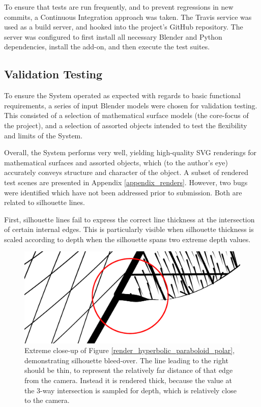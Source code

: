 To ensure that tests are run frequently, and to prevent regressions in new commits, a Continuous Integration approach was taken.
The Travis service was used as a build server, and hooked into the project's GitHub repository.
The server was configured to first install all necessary Blender and Python dependencies, install the add-on, and then execute the test suites.



\subsection{Validation Testing}

To ensure the System operated as expected with regards to basic functional requirements, a series of input Blender models were chosen for validation testing.
This consisted of a selection of mathematical surface models (the core-focus of the project), and a selection of assorted objects intended to test the flexibility and limits of the System.

Overall, the System performs very well, yielding high-quality SVG renderings for mathematical surfaces and assorted objects, which (to the author's eye) accurately conveys structure and character of the object. A subset of rendered test scenes are presented in Appendix \ref{appendix_renders}. However, two bugs were identified which have not been addressed prior to submission. Both are related to silhouette lines.

First, silhouette lines fail to express the correct line thickness at the intersection of certain internal edges. This is particularly visible when silhouette thickness is scaled according to depth when the silhouette spans two extreme depth values.

\begin{figure}[h!]
	\centering
	\includegraphics[width=\textwidth]{images/silhouette_bug.png}
	\caption{Extreme close-up of Figure \ref{render_hyperbolic_paraboloid_polar}, demonstrating silhouette bleed-over. The line leading to the right should be thin, to represent the relatively far distance of that edge from the camera. Instead it is rendered thick, because the value at the 3-way intersection is sampled for depth, which is relatively close to the camera.}\label{silhouette_bug}
\end{figure}

